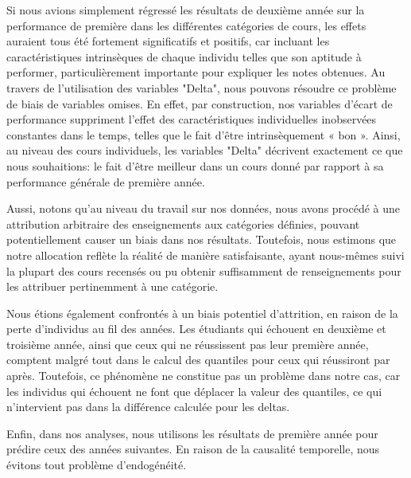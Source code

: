 Si nous avions simplement régressé les résultats de deuxième année sur la performance de première dans les différentes catégories de cours, les effets auraient tous été fortement significatifs et positifs, car incluant les caractéristiques intrinsèques de chaque individu telles que son aptitude à performer, particulièrement importante pour expliquer les notes obtenues. Au travers de l'utilisation des variables "Delta", nous pouvons résoudre ce problème de biais de variables omises. En effet, par construction, nos variables d’écart de performance suppriment l'effet des caractéristiques individuelles inobservées constantes dans le temps, telles que le fait d’être intrinsèquement « bon ». Ainsi, au niveau des cours individuels, les variables "Delta" décrivent exactement ce que nous souhaitions: le fait d'être meilleur dans un cours donné par rapport à sa performance générale de première année.

Aussi, notons qu'au niveau du travail sur nos données, nous avons procédé à une attribution arbitraire des enseignements aux catégories définies, pouvant potentiellement causer un biais dans nos résultats. Toutefois, nous estimons que notre allocation reflète la réalité de manière satisfaisante, ayant nous-mêmes suivi la plupart des cours recensés ou pu obtenir suffisamment de renseignements pour les attribuer pertinemment à une catégorie.

Nous étions également confrontés à un biais potentiel d'attrition, en raison de la perte d'individus au fil des années. Les étudiants qui échouent en deuxième et troisième année, ainsi que ceux qui ne réussissent pas leur première année, comptent malgré tout dans le calcul des quantiles pour ceux qui réussiront par après. Toutefois, ce phénomène ne constitue pas un problème dans notre cas, car les individus qui échouent ne font que déplacer la valeur des quantiles, ce qui n'intervient pas dans la différence calculée pour les deltas.

Enfin, dans nos analyses, nous utilisons les résultats de première année pour prédire ceux des années suivantes. En raison de la causalité temporelle, nous évitons tout problème d'endogénéité.

